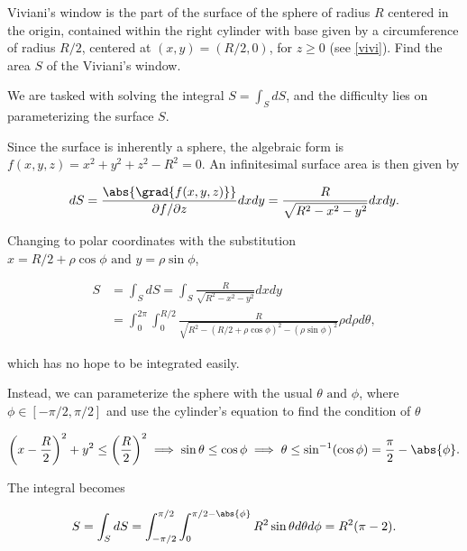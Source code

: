 \documentclass[english,a4paper,12pt]{report}
\begin{document}
{Viviani's window is the part of the surface of the sphere of radius \(R\) centered in the origin, contained within the right cylinder with base given by a circumference of radius \( R/2\), centered at \((x,y) = \left(R /2, 0\right)\), for \(z \ge 0\) (see \cref{vivi}). Find the area \(S\) of the Viviani's window.}
{We are tasked with solving the integral \(S = \int_{S}^{} dS \), and the difficulty lies on parameterizing the surface \(S\). 

Since the surface is inherently a sphere, the algebraic form is \(f(x,y,z) = x^2+y^2+z^2-R^2= 0\). An infinitesimal surface area is then given by 

\begin{equation}
	dS = \frac{\abs{\grad{f(x,y,z)} } }{\partial f/\partial z}dxdy = \frac{R}{\sqrt{R^2-x^2-y^2} }dxdy.  
\end{equation}

Changing to polar coordinates with the substitution \(x = R/2 + \rho \cos \phi \text { and } y = \rho \sin \phi \),

\begin{equation}
	\begin{aligned} 
	S &= \int_{S}^{} dS = \int_{S}^{} \frac{R}{\sqrt{R^2-x^2-y^2} }dxdy \\
	&= \int_{0}^{2\pi } \int_{0}^{R /2} \frac{R}{\sqrt{R^2-(R/2 + \rho \cos \phi )^2 - (\rho \sin \phi )^2} } \rho d\rho d\theta ,   
	\end{aligned}   
\end{equation}

which has no hope to be integrated easily.

Instead, we can parameterize the sphere with the usual \(\theta \text { and } \phi \), where \(\phi \in [-\pi /2, \pi /2]\) and use the cylinder's equation to find the condition of \(\theta \)

\begin{equation}
	\left( x-\frac{R}{2}  \right)^2+y^2 \le \left( \frac{R}{2}  \right)^2 \implies \sin \theta \le \cos \phi \implies \theta \le \sin ^{-1} (\cos \phi ) =  \frac{\pi }{2} - \abs{\phi }.  
\end{equation}

The integral becomes 

\begin{equation}
	S = \int_{S}^{} dS = \int_{-\pi /2}^{\pi /2} \int_{0}^{\pi /2 - \abs{\phi } } R^2\sin \theta d \theta d\phi = R^2(\pi -2).     
\end{equation}

}
\end{document}
